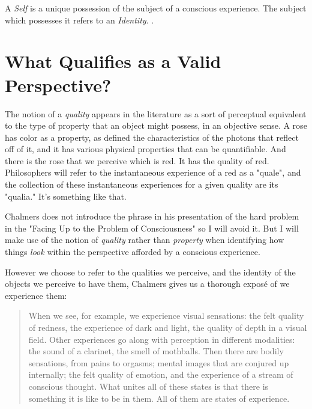 \documentclass[runningheads]{llncs}
\begin{document}
\begin{assertion}
	A \emph{Self} is a unique possession of the subject of a conscious experience. The subject which possesses it refers to an \emph{Identity}. \cite{Formalism}.
\end{assertion}


\section{What Qualifies as a Valid Perspective?}

The notion of a \emph{quality} appears in the literature as a sort of perceptual equivalent to the type of property that an object might possess, in an objective sense. A rose has color as a property, as defined the characteristics of the photons that reflect off of it, and it has various physical properties that can be quantifiable. And there is the rose that we perceive which is red. It has the quality of red. Philosophers will refer to the instantaneous experience of a red as a "quale", and the collection of these instantaneous experiences for a given quality are its "qualia." It's something like that.  

Chalmers does not introduce the phrase in his presentation of the hard problem in the "Facing Up to the Problem of Consciousness" so I will avoid it. But I will make use of the notion of \emph{quality} rather than \emph{property} when identifying how things \emph{look} within the perspective afforded by a conscious experience. 

However we choose to refer to the qualities we perceive, and the identity of the objects we perceive to have them, Chalmers gives us a thorough exposé of we experience them: 

\begin{quote}
When we see, for example, we experience visual sensations: the felt quality of redness, the experience of dark and light, the quality of depth in a visual field. Other experiences go along with perception in different modalities: the sound of a clarinet, the smell of mothballs. Then there are bodily sensations, from pains to orgasms; mental images that are conjured up internally; the felt quality of emotion, and the experience of a stream of conscious thought. What unites all of these states is that there is something it is like to be in them. All of them are states of experience.
\end{quote}
\end{document}
